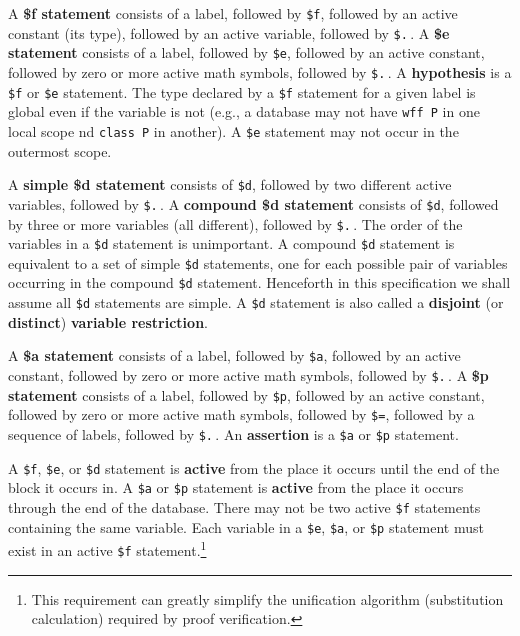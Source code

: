 A {\bf \$f statement} consists of a label,
followed by \texttt{\$f}, followed by an active constant (its type), followed by an
active variable, followed by \texttt{\$.}\,.  A {\bf \$e
statement} consists of a label, followed
by \texttt{\$e}, followed by an active constant, followed by zero or more
active math symbols, followed by \texttt{\$.}\,.  A {\bf
hypothesis} is a \texttt{\$f} or \texttt{\$e}
statement.
The type declared by a \texttt{\$f} statement for a given label
is global even if the variable is not
(e.g., a database may not have \texttt{wff P} in one local scope
nd \texttt{class P} in another).
A \texttt{\$e} statement may not occur in the outermost scope.

A {\bf simple \$d statement}
consists of \texttt{\$d}, followed by two different active variables,
followed by \texttt{\$.}\,.  A {\bf compound \$d
statement} consists of
\texttt{\$d}, followed by three or more variables (all different),
followed by \texttt{\$.}\,.  The order of the variables in a
\texttt{\$d} statement is unimportant.  A compound \texttt{\$d}
statement is equivalent to a set of simple \texttt{\$d} statements, one
for each possible pair of variables occurring in the compound
\texttt{\$d} statement.  Henceforth in this specification we shall
assume all \texttt{\$d} statements are simple.  A \texttt{\$d} statement
is also called a {\bf disjoint} (or {\bf distinct}) {\bf variable
restriction}.

A {\bf \$a statement} consists of a label,
followed by \texttt{\$a}, followed by an active constant, followed by
zero or more active math symbols, followed by \texttt{\$.}\,.  A {\bf
\$p statement} consists of a label,
followed by \texttt{\$p}, followed by an active constant, followed by
zero or more active math symbols, followed by \texttt{\$=}, followed by
a sequence of labels, followed by \texttt{\$.}\,.  An {\bf
assertion} is a \texttt{\$a} or \texttt{\$p} statement.

A \texttt{\$f}, \texttt{\$e}, or \texttt{\$d} statement is {\bf active} from the place it occurs until the end of the block it occurs in.
A \texttt{\$a} or \texttt{\$p} statement is {\bf active} from the place it occurs
through the end of the database.
There may not be two active \texttt{\$f} statements containing the same
variable.  Each variable in a \texttt{\$e}, \texttt{\$a}, or
\texttt{\$p} statement must exist in an active \texttt{\$f}
statement.\footnote{This requirement can greatly simplify the
unification algorithm (substitution calculation) required by proof
verification.}

